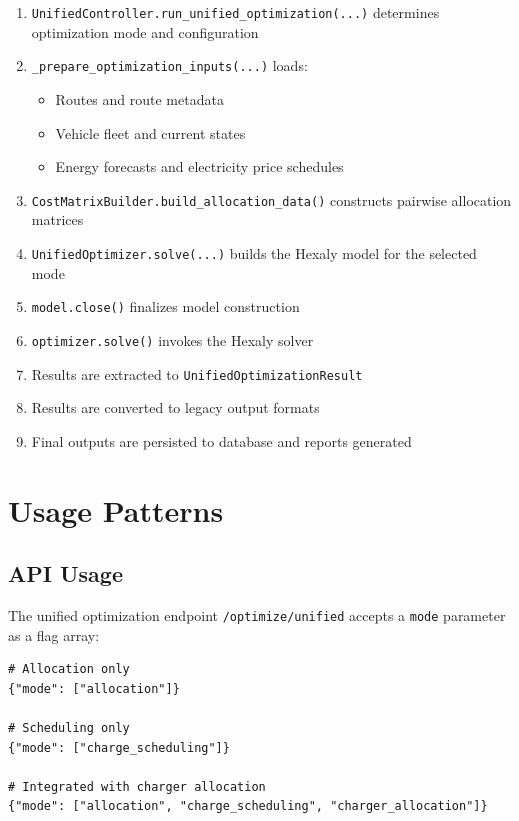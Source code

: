 \documentclass[11pt,a4paper]{article}
\begin{document}
\begin{enumerate}
    \item \texttt{UnifiedController.run\_unified\_optimization(...)} determines optimization mode and configuration
    
    \item \texttt{\_prepare\_optimization\_inputs(...)} loads:
    \begin{itemize}
        \item Routes and route metadata
        \item Vehicle fleet and current states
        \item Energy forecasts and electricity price schedules
    \end{itemize}
    
    \item \texttt{CostMatrixBuilder.build\_allocation\_data()} constructs pairwise allocation matrices
    
    \item \texttt{UnifiedOptimizer.solve(...)} builds the Hexaly model for the selected mode
    
    \item \texttt{model.close()} finalizes model construction
    
    \item \texttt{optimizer.solve()} invokes the Hexaly solver
    
    \item Results are extracted to \texttt{UnifiedOptimizationResult}
    
    \item Results are converted to legacy output formats
    
    \item Final outputs are persisted to database and reports generated
\end{enumerate}

\section{Usage Patterns}

\subsection{API Usage}

The unified optimization endpoint \texttt{/optimize/unified} accepts a \texttt{mode} parameter as a flag array:

\begin{lstlisting}[style=pythoncode]
# Allocation only
{"mode": ["allocation"]}

# Scheduling only
{"mode": ["charge_scheduling"]}

# Integrated with charger allocation
{"mode": ["allocation", "charge_scheduling", "charger_allocation"]}
\end{lstlisting}
\end{document}
